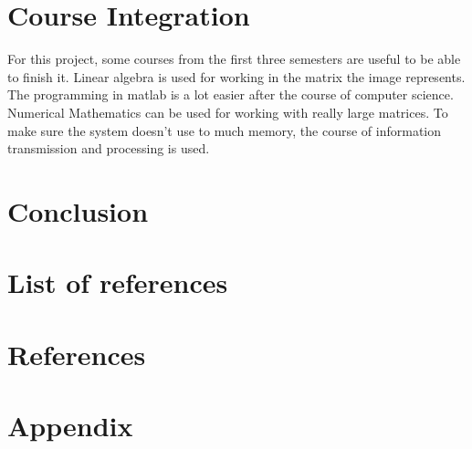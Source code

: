 \documentclass[11pt]{article}
\begin{document}
\section{Course Integration}
For this project, some courses from the first three semesters are useful to be able to finish it. Linear algebra is used for working in the matrix the image represents. The programming in matlab is a lot easier after the course of computer science. Numerical Mathematics can be used for working with really large matrices. To make sure the system doesn't use to much memory, the course of information transmission and processing is used.

\section{Conclusion}

\section{List of references}
\section{References}





\section{Appendix}
\end{document}
